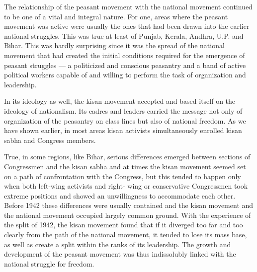 The relationship of the peasant movement with the national movement continued to be one of a vital and integral nature. For one, areas where the peasant movement was active were usually the ones that had been drawn into the earlier national struggles. This was true at least of Punjab, Kerala, Andhra, U.P. and Bihar. This was hardly surprising since it was the spread of the national movement that had created the initial conditions required for the emergence of peasant struggles — a politicized and conscious peasantry and a band of active political workers capable of and willing to perform the task of organization and leadership.

In its ideology as well, the kisan movement accepted and based itself on the ideology of nationalism. Its cadres and leaders carried the message not only of organization of the peasantry on class lines but also of national freedom. As we have shown earlier, in most areas kisan activists simultaneously enrolled kisan sabha and Congress members.

True, in some regions, like Bihar, serious differences emerged between sections of Congressmen and the kisan sabha and at times the kisan movement seemed set on a path of confrontation with the Congress, but this tended to happen only when both left-wing activists and right- wing or conservative Congressmen took extreme positions and showed an unwillingness to accommodate each other. Before 1942 these differences were usually contained and the kisan movement and the national movement occupied largely common ground. With the experience of the split of 1942, the kisan movement found that if it diverged too far and too clearly from the path of the national movement, it tended to lose its mass base, as well as create a split within the ranks of its leadership. The growth and development of the peasant movement was thus indissolubly linked with the national struggle for freedom.
